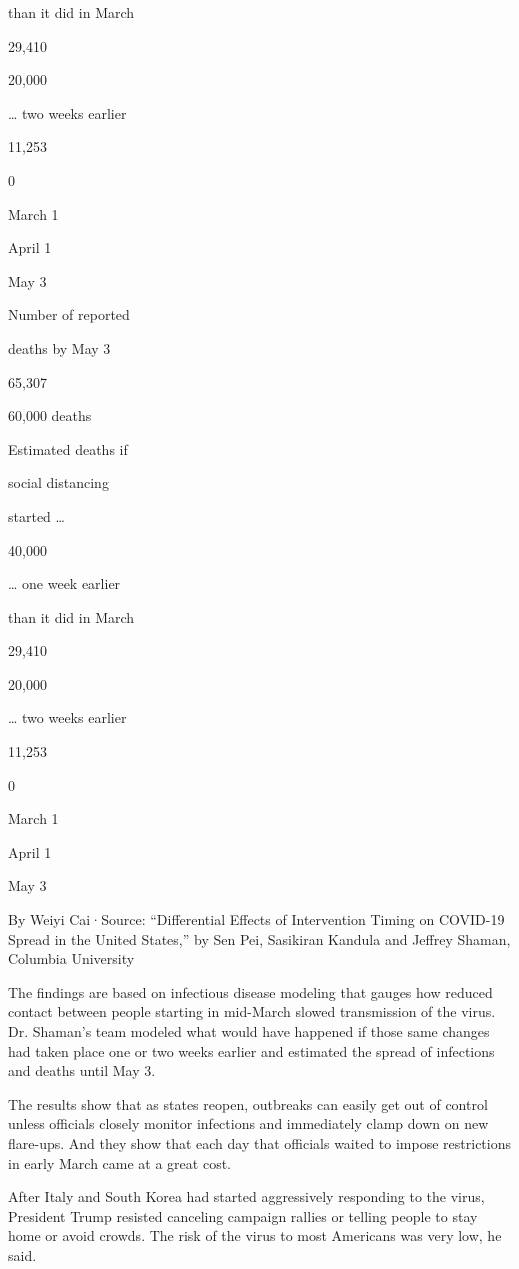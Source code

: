 than it did in March

29,410

20,000

\ldots{} two weeks earlier

11,253

0

March 1

April 1

May 3

Number of reported

deaths by May 3

65,307

60,000 deaths

Estimated deaths if

social distancing

started \ldots{}

40,000

\ldots{} one week earlier

than it did in March

29,410

20,000

\ldots{} two weeks earlier

11,253

0

March 1

April 1

May 3

By Weiyi Cai·Source: ``Differential Effects of Intervention Timing on
COVID-19 Spread in the United States,'' by Sen Pei, Sasikiran Kandula
and Jeffrey Shaman, Columbia University

The findings are based on infectious disease modeling that gauges how
reduced contact between people starting in mid-March slowed transmission
of the virus. Dr. Shaman's team modeled what would have happened if
those same changes had taken place one or two weeks earlier and
estimated the spread of infections and deaths until May 3.

The results show that as states reopen, outbreaks can easily get out of
control unless officials closely monitor infections and immediately
clamp down on new flare-ups. And they show that each day that officials
waited to impose restrictions in early March came at a great cost.

After Italy and South Korea had started aggressively responding to the
virus, President Trump resisted canceling campaign rallies or telling
people to stay home or avoid crowds. The risk of the virus to most
Americans was very low, he said.


